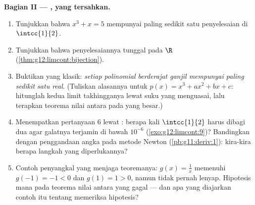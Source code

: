 \begin{problem}
\medskip
\noindent\textbf{Bagian II --- , yang tersahkan.}
\begin{enumerate}[resume]
  \item Tunjukkan bahwa  $x^3 + x = 5$ mempunyai paling sedikit satu
        penyelesaian di $\intcc{1}{2}$.
  \item Tunjukkan bahwa penyelesaiannya tunggal pada $\R$
        (\cref{thm:g12:limcont:bijection}).
  \item Buktikan yang klasik: \emph{setiap polinomial berderajat ganjil
        mempunyai paling sedikit satu  real}. (Tuliskan alasannya
        untuk $p(x) = x^3 + a x^2 + b x + c$: hitunglah kedua
        limit takhingganya lewat suku yang menguasai, lalu terapkan teorema
        nilai antara pada  yang besar.)
  \item Menempatkan  pertanyaan 6 lewat : berapa kali
        $\intcc{1}{2}$ harus dibagi dua agar galatnya terjamin di bawah
        $10^{-6}$ (\cref{exo:g12:limcont:9})? Bandingkan dengan
        penggandaan angka pada metode Newton
        (\cref{pb:g11:deriv:1}): kira-kira berapa langkah yang
        diperlukannya?
  \item Contoh penyangkal yang menjaga teoremanya:
        $g(x) = \frac1x$ memenuhi $g(-1) = -1 < 0$ dan
        $g(1) = 1 > 0$, namun tidak pernah lenyap. Hipotesis mana pada
        teorema nilai antara yang gagal --- dan apa yang diajarkan contoh itu
        tentang memeriksa hipotesis?
\end{enumerate}


\end{problem}
